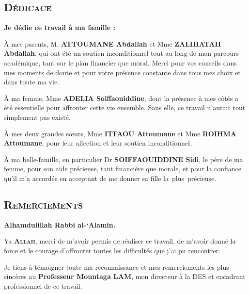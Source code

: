 \documentclass[a4paper,12pt]{report}                %
\begin{document}
    \restoregeometry %
    \begin{center}
        \section*{\textsc{\LARGE Dédicace}}
    \end{center}
    \bigskip
    \textbf{Je dédie ce travail à ma famille :}

    \bigskip

    À mes parents, M. \textbf{ATTOUMANE Abdallah} et Mme \textbf{ZALIHATAH Abdallah}, qui ont été un soutien inconditionnel tout au long de mon parcours académique, 
    tant sur le plan financier que moral. Merci pour vos conseils dans mes moments de doute et pour votre présence constante dans tous mes choix et dans toute ma vie.

    \bigskip

    À ma femme, Mme \textbf{ADELIA Soiffaouiddine}, dont la présence à mes côtés a été essentielle pour affronter cette vie ensemble. 
    Sans elle, ce travail n’aurait tout simplement pas existé.

    \bigskip

    À mes deux grandes sœurs, Mme \textbf{ITFAOU Attoumane} et Mme \textbf{ROIHMA Attoumane}, pour leur affection et leur soutien inconditionnel.

    \bigskip

    À ma belle-famille, en particulier Dr \textbf{SOIFFAOUIDDINE Sidi}, le père de ma femme, pour son aide précieuse, tant financière que morale, 
    et pour la confiance qu’il m’a accordée en acceptant de me donner sa fille la plus précieuse.
    \newpage
    \begin{center}
        \section*{\textsc{\LARGE Remerciements}}
    \end{center}
    \bigskip
    \textbf{\large Alhamdulillah Rabbi al-‘Alamin.}

    \bigskip

    Ya \textbf{\textsc{\Large Allah}}, merci de m'avoir permis de réaliser ce travail, de m'avoir donné la force et le courage d'affronter toutes les difficultés que j'ai pu rencontrer.
    
    \medskip

    Je tiens à témoigner toute ma reconnaissance et mes remerciements les plus sincères au \textbf{\large Professeur Mountaga LAM}, mon directeur à la DES et encadrant professionnel de ce travail.
\end{document}

